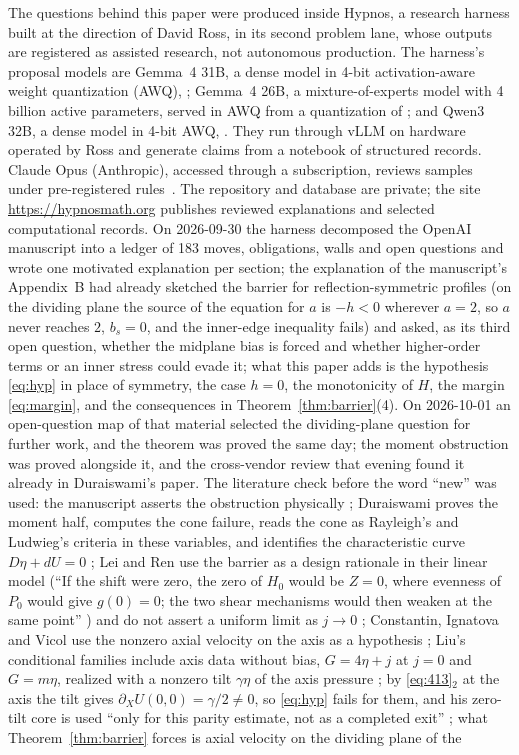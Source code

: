 \documentclass[11pt]{article}
\newcommand{\bs}{b_s}
\begin{document}
The questions behind this paper were produced inside Hypnos, a research harness built at the direction of David Ross, in its second problem lane, whose outputs are registered as assisted research, not autonomous production. The harness's proposal models are Gemma~4 31B, a dense model in 4-bit activation-aware weight quantization (AWQ), ; Gemma~4 26B, a mixture-of-experts model with 4 billion active parameters, served in AWQ from a quantization of ; and Qwen3 32B, a dense model in 4-bit AWQ, . They run through vLLM on hardware operated by Ross and generate claims from a notebook of structured records. Claude Opus (Anthropic), accessed through a subscription, reviews samples under pre-registered rules~\cite{HypnosMethods}. The repository and database are private; the site \url{https://hypnosmath.org} publishes reviewed explanations and selected computational records. On 2026-09-30 the harness decomposed the OpenAI manuscript into a ledger of 183 moves, obligations, walls and open questions and wrote one motivated explanation per section; the explanation of the manuscript's Appendix~B had already sketched the barrier for reflection-symmetric profiles (on the dividing plane the source of the equation for $a$ is $-h<0$ wherever $a=2$, so $a$ never reaches $2$, $\bs=0$, and the inner-edge inequality fails) and asked, as its third open question, whether the midplane bias is forced and whether higher-order terms or an inner stress could evade it; what this paper adds is the hypothesis \eqref{eq:hyp} in place of symmetry, the case $h=0$, the monotonicity of $H$, the margin \eqref{eq:margin}, and the consequences in Theorem~\ref{thm:barrier}(4). On 2026-10-01 an open-question map of that material selected the dividing-plane question for further work, and the theorem was proved the same day; the moment obstruction was proved alongside it, and the cross-vendor review that evening found it already in Duraiswami's paper. The literature check before the word ``new'' was used: the manuscript asserts the obstruction physically \cite[p.~5]{OpenAINS}; Duraiswami proves the moment half, computes the cone failure, reads the cone as Rayleigh's and Ludwieg's criteria in these variables, and identifies the characteristic curve $D\eta+dU=0$ \cite[pp.~6, 20--22]{Duraiswami}; Lei and Ren use the barrier as a design rationale in their linear model (``If the shift were zero, the zero of $H_0$ would be $Z=0$, where evenness of $P_0$ would give $g(0)=0$; the two shear mechanisms would then weaken at the same point'' \cite[p.~109]{LeiRen}) and do not assert a uniform limit as $j\to0$ \cite[p.~108]{LeiRen}; Constantin, Ignatova and Vicol use the nonzero axial velocity on the axis as a hypothesis \cite[p.~11]{CIV}; Liu's conditional families include axis data without bias, $G=4\eta+j$ at $j=0$ and $G=m\eta$, realized with a nonzero tilt $\gamma\eta$ of the axis pressure \cite[Theorem~3.1(ii)--(iii), p.~6]{Liu}; by \eqref{eq:413}$_2$ at the axis the tilt gives $\partial_XU(0,0)=\gamma/2\ne0$, so \eqref{eq:hyp} fails for them, and his zero-tilt core is used ``only for this parity estimate, not as a completed exit'' \cite[p.~19]{Liu}; what Theorem~\ref{thm:barrier} forces is axial velocity on the dividing plane of the 
\end{document}
